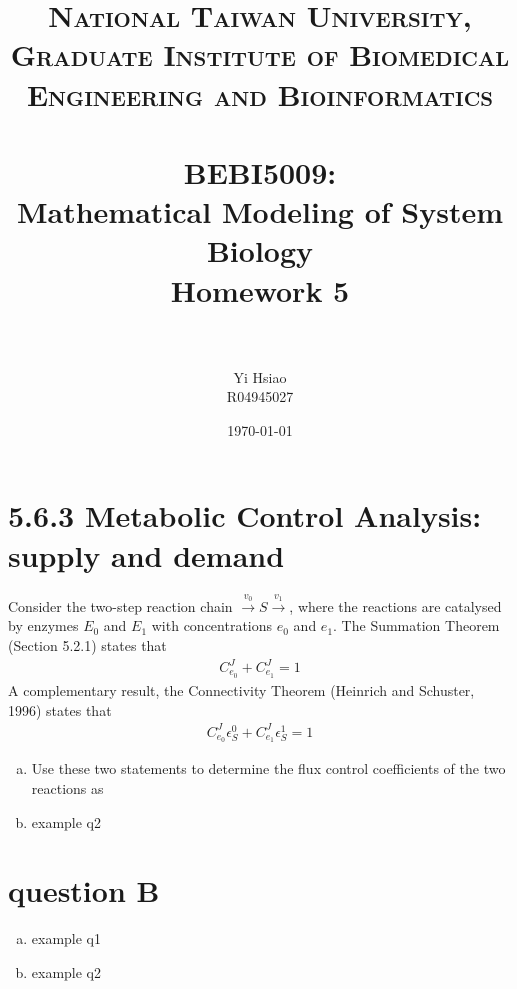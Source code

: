 \documentclass[paper=a4, fontsize=11pt]{scrartcl} %
\title{	
\normalfont \normalsize 
\textsc{National Taiwan University, \\ Graduate Institute of Biomedical Engineering and Bioinformatics} \\ [25pt] %
\horrule{0.5pt} \\[0.4cm] %
\huge BEBI5009:\\Mathematical Modeling of System Biology \\ Homework 5 \\ %
\horrule{2pt} \\[0.5cm] %
}
\author{Yi Hsiao\\R04945027} %
\date{\normalsize\today} %
\numberwithin{equation}{section} %
\numberwithin{figure}{section} %
\numberwithin{table}{section} %
\begin{document}
\maketitle %

\newpage
\section{5.6.3 Metabolic Control Analysis: supply and demand}
	Consider the two-step reaction chain $\xrightarrow{v_0}S\xrightarrow{v_1}$, where the reactions are catalysed by enzymes $E_0$ and $E_1$ with concentrations $e_0$ and $e_1$. The Summation Theorem (Section 5.2.1) states that
	\begin{align*}
		C_{e_0}^J+C_{e_1}^J=1
	\end{align*}
	A complementary result, the Connectivity Theorem (Heinrich and Schuster, 1996) states that
	\begin{align*}
		C_{e_0}^J\epsilon_S^0+C_{e_1}^J\epsilon_S^1=1
	\end{align*}
	\begin{enumerate}[a)]
		\item Use these two statements to determine the flux control coefficients of the two reactions as
		\item example q2
	\end{enumerate}
\section{question B}
	\begin{enumerate}[a)]
		\item example q1
		\item example q2
	\end{enumerate}
\end{document}
